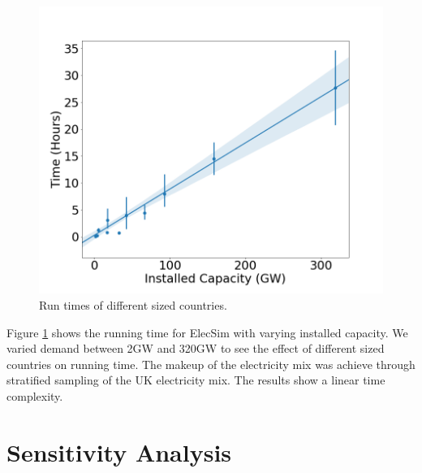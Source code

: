 \begin{figure}
	\centering
	\includegraphics[width=0.7\linewidth]{Chapter4/figures/timing_plot.png}
	\caption{Run times of different sized countries.}
	\label{fig:timingplot}
	\vskip -0.5cm
\end{figure}


Figure \ref{fig:timingplot} shows the running time for ElecSim with varying installed capacity. We varied demand between 2GW and 320GW to see the effect of different sized countries on running time. The makeup of the electricity mix was achieve through stratified sampling of the UK electricity mix. The results show a linear time complexity. 






\section{Sensitivity Analysis}

